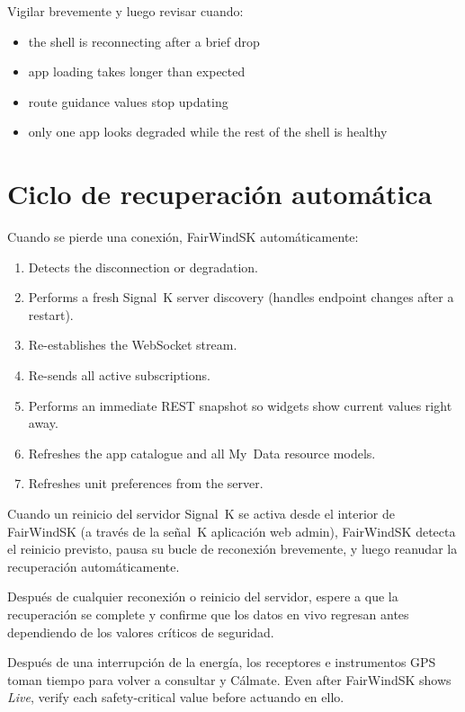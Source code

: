 Vigilar brevemente y luego revisar cuando:

\begin{itemize}
  \item the shell is reconnecting after a brief drop
  \item app loading takes longer than expected
  \item route guidance values stop updating
  \item only one app looks degraded while the rest of the shell is healthy
\end{itemize}

\section{Ciclo de recuperación automática}

Cuando se pierde una conexión, FairWindSK automáticamente:

\begin{enumerate}
  \item Detects the disconnection or degradation.
  \item Performs a fresh Signal~K server discovery (handles endpoint changes after a restart).
  \item Re-establishes the WebSocket stream.
  \item Re-sends all active subscriptions.
  \item Performs an immediate REST snapshot so widgets show current values right away.
  \item Refreshes the app catalogue and all My~Data resource models.
  \item Refreshes unit preferences from the server.
\end{enumerate}

Cuando un reinicio del servidor Signal~K se activa desde el interior de FairWindSK (a través de la señal~K
aplicación web admin), FairWindSK detecta el reinicio previsto, pausa su bucle de reconexión
brevemente, y luego reanudar la recuperación automáticamente.

Después de cualquier reconexión o reinicio del servidor, espere a que la recuperación se complete y confirme
que los datos en vivo regresan antes dependiendo de los valores críticos de seguridad.

\begin{warningbox}
Después de una interrupción de la energía, los receptores e instrumentos GPS toman tiempo para volver a consultar y
Cálmate.
Even after FairWindSK shows \textit{Live}, verify each safety-critical value before
actuando en ello.
\end{warningbox}

